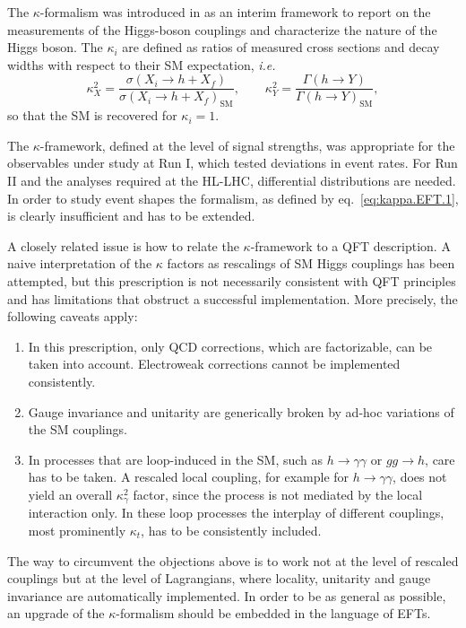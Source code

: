 The $\kappa$-formalism was introduced in\cite{LHCHiggsCrossSectionWorkingGroup:2012nn,Heinemeyer:2013tqa} as an interim framework to report on the measurements of the Higgs-boson couplings and characterize the nature of the Higgs boson. The $\kappa_{i}$ are defined as ratios of measured cross sections and decay widths with respect to their SM expectation, {\it i.e.}
\begin{equation}
  \label{eq:kappa.EFT.1}
  \kappa^{2}_{X} = \frac{\sigma(X_i\rightarrow h+X_f)}{\sigma(X_i\rightarrow h+X_f)_{\text{SM}}}, \qquad \kappa^{2}_{Y} = \frac{\Gamma(h\rightarrow Y)}{\Gamma(h\rightarrow Y)_{\text{SM}}},
\end{equation}
so that the SM is recovered for $\kappa_i=1$.

The $\kappa$-framework, defined at the level of signal strengths, was appropriate for the observables under study at Run I, which tested deviations in event rates. For Run II and the analyses required at the HL-LHC, differential distributions are needed. In order to study event shapes the formalism, as defined by eq.~\eqref{eq:kappa.EFT.1}, is clearly insufficient and has to be extended.

A closely related issue is how to relate the $\kappa$-framework to a QFT description. A naive interpretation of the $\kappa$ factors as rescalings of SM Higgs couplings has been attempted, but this prescription is not necessarily consistent with QFT principles and has limitations that obstruct a successful implementation. More precisely, the following caveats apply:
\begin{enumerate}
\item In this prescription, only QCD corrections, which are factorizable, can be taken into account. Electroweak corrections cannot be implemented consistently.
\item Gauge invariance and unitarity are generically broken by ad-hoc variations of the SM couplings.
\item  In processes that are loop-induced in the SM, such as $h\to \gamma\gamma$ or $gg\to h$, care has to be taken. A rescaled local coupling, for example for $h\to \gamma\gamma$, does not yield an overall $\kappa_{\gamma}^2$ factor, since the process is not mediated by the local interaction only. In these loop processes the interplay of different couplings, most prominently $\kappa_t$, has to be consistently included.        
\end{enumerate}
The way to circumvent the objections above is to work not at the level of rescaled couplings but at the level of Lagrangians, where locality, unitarity and gauge invariance are automatically implemented. In order to be as general as possible, an upgrade of the $\kappa$-formalism should be embedded in the language of EFTs.

